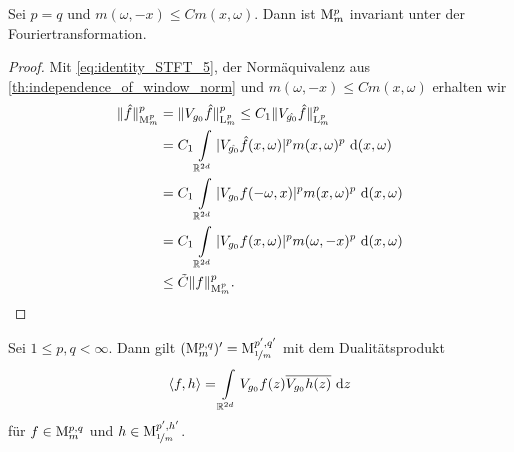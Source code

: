 \begin{lem}\label{th:mod_space_FT_invariance}
	Sei $ p = q $ und $ m(\omega,-x) \leq C m(x,\omega) $.
	Dann ist $ \mathrm{M}_m^p $ invariant unter der Fouriertransformation.
\end{lem}

\begin{proof}
	Mit \eqref{eq:identity_STFT_5}, der Normäquivalenz aus \ref{th:independence_of_window_norm} und $ m(\omega,-x) \leq C m(x,\omega) $ erhalten wir
	\begin{align*}
	\| \hat{f} \|_{\mathrm{M}_m^p}^p
	&=
	\| V_{g_0} \hat{f} \|_{\mathrm{L}^p_m}^p
	\leq 
	C_1
	\| V_{\hat{g_0}} \hat{f} \|_{\mathrm{L}_m^p}^p\\
	&=
	C_1
	\int \limits_{\mathbb{R}^{2d}} |V_{\hat{g_0}} \hat{f}(x,\omega) |^p  m(x,\omega)^p \text{ d} (x,\omega)\\
	&=
	C_1
	\int \limits_{\mathbb{R}^{2d}} |V_{g_0} f(-\omega,x) |^p  m(x,\omega)^p 
 	\text{ d} (x,\omega) \\
 	&=
 	C_1
 	\int \limits_{\mathbb{R}^{2d}} |V_{g_0} f(x,\omega) |^p  m(\omega,-x)^p
 	\text{ d} (x,\omega)\\
 	&\leq
 	\tilde{C} \| f \|_{\mathrm{M}_m^p}^p. 	\qedhere
 	\end{align*}
\end{proof}


\begin{sz}
	Sei $ 1 \leq p,q < \infty $.
	Dann gilt $ (\mathrm{M}_m^{p,q})^\prime = \mathrm{M}^{p^\prime,q^\prime}_{\nicefrac{1}{m}} $ mit dem Dualitätsprodukt
	\begin{align}
		\langle f, h \rangle
		=
		\int \limits_{\mathbb{R}^{2d}} V_{g_0} f(z) \overline{V_{g_0} h(z)} \text{ d} z
	\end{align}
	für $ f \in \mathrm{M}^{p,q}_m $ und $ h \in \mathrm{M}^{p^\prime,h^\prime}_{\nicefrac{1}{m}} $.
\end{sz}

